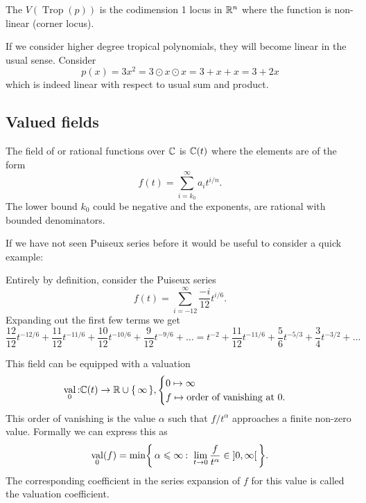 \documentclass[12pt]{memoir}
\DeclareMathOperator{\val}{val}
\DeclareMathOperator{\Trop}{Trop}
\theoremstyle{definition}
\def\al{\alpha}
\begin{document}
\begin{Def}
    The  $V(\Trop(p))$ is the codimension 1 locus in $\mathbb{R}^n$ where the function is non-linear (corner locus).
\end{Def}

\begin{Ex}
If we consider higher degree tropical polynomials, they will become linear in the usual sense. Consider 
$$p(x)=3x^2=3\odot x\odot x=3+x+x=3+2x$$
which is indeed linear with respect to usual sum and product.
\end{Ex}

\subsection{Valued fields}

\begin{Def}
The field of  or rational functions over $\mathbb{C}$ is $\mathbb{C}(t)$ where the elements are of the form 
$$f(t)=\sum_{i=k_0}^\infty a_it^{i/n}.$$
The lower bound $k_0$ could be negative and the exponents, are rational with bounded denominators. 
\end{Def}

If we have not seen Puiseux series before it would be useful to consider a quick example:

\begin{Ex}
    Entirely by definition, consider the Puiseux series 
    $$f(t)=\sum_{i=-12}^\infty \frac{-i}{12}t^{i/6}.$$
    Expanding out the first few terms we get 
    $$\frac{12}{12}t^{-12/6}+\frac{11}{12}t^{-11/6}+\frac{10}{12}t^{-10/6}+\frac{9}{12}t^{-9/6}+\dots=t^{-2}+\frac{11}{12}t^{-11/6}+\frac{5}{6}t^{-5/3}+\frac{3}{4}t^{-3/2}+\dots$$
\end{Ex}
This field can be equipped with a valuation
$$\val_0\:\bC(t)\to\bR\cup\set{\infty},\begin{cases}
    0\mapsto \infty\\
    f\mapsto\text{order of vanishing at }0.
\end{cases}$$
This order of vanishing is the value $\al$ such that $f/t^\al$ approaches a finite non-zero value. Formally we can express this as 
$$\val_0(f)=\min\Set{\al\leq\infty\:\ \lim_{t\to0}\frac{f}{t^\al}\in\obonj{0,\infty}}.$$
The corresponding coefficient in the series expansion of $f$ for this value is called the valuation coefficient.
\end{document}
